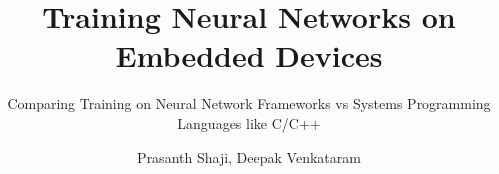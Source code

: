 \documentclass{UUThesisTemplate}
\author{Prasanth Shaji, Deepak Venkataram}
\title{Training Neural Networks on Embedded Devices}
\subtitle{Comparing Training on Neural Network Frameworks vs Systems Programming Languages like C/C++}
\begin{document}
\frontmatter
	\frontmatterCS



	\begingroup
		\tableofcontents
	\endgroup


\mainmatter
	
	
	

\backmatter
	\nocite{*} %
	
	
\end{document}
